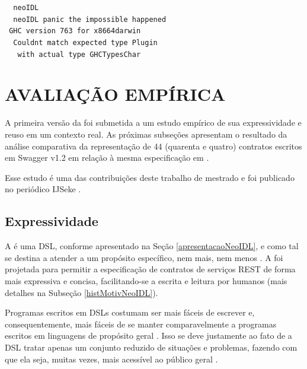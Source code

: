 \vspace{-6mm}
\begin{tabbing}\tt
~neoIDL\\
\tt
~neoIDL~panic~the~impossible~happened\\
\tt ~GHC~version~763~for~x8664darwin\\
\tt ~~Couldnt~match~expected~type~Plugin\\
\tt ~~~with~actual~type~GHCTypesChar
\end{tabbing}


\section{AVALIAÇÃO EMPÍRICA}
\label{EstudoExpressividadeReuso}
\vspace{-6mm}

A primeira versão da \neoidl{} foi submetida a um estudo empírico de sua expressividade 
e reuso em um contexto real. As próximas subseções apresentam 
o resultado da análise comparativa da representação de 44 (quarenta e quatro)
contratos escritos em Swagger v1.2 em relação à mesma especificação em
\neoidl{}.

Esse estudo é uma das contribuições deste trabalho de mestrado e foi publicado
no periódico IJSeke \cite{lima2015neoidl}.

\subsection{Expressividade}
\label{estudoExpressividadeNeoIDL}
\vspace{-6mm}

A \neoidl{} é uma DSL, conforme apresentado na Seção \ref{apresentacaoNeoIDL},
e como tal se destina a atender a um propósito específico, nem mais, nem menos
\cite{hudak1998modular}. A \neoidl{} foi projetada para permitir a
especificação de contratos de serviços REST de forma mais expressiva e concisa,
facilitando-se a escrita e leitura por humanos (mais detalhes na Subseção
\ref{histMotivNeoIDL}).

Programas escritos em DSLs costumam ser mais fáceis de escrever e,
consequentemente, mais fáceis de se manter comparavelmente a programas escritos
em linguagens de propósito geral \cite{hudak1998modular}. Isso se deve
justamente ao fato de a DSL tratar apenas um conjunto reduzido de situações e
problemas, fazendo com que ela seja, muitas vezes, mais acessível ao público
geral \cite{taha2008domain}.

